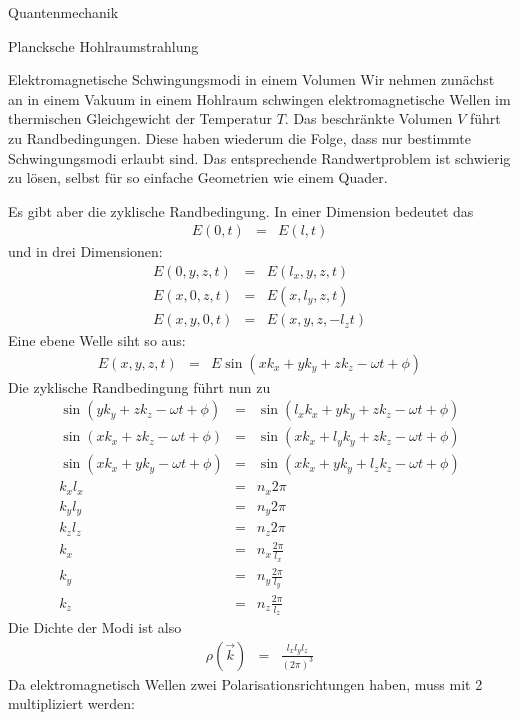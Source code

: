 \def\titlestr{Quantenmechanik}
\ifx\makebook\undefined
	
\else
	\begin{chapter}{\titlestr}
\fi
\begin{section}{Plancksche Hohlraumstrahlung}
\begin{subsection}{Elektromagnetische Schwingungsmodi in einem Volumen}
Wir nehmen zunächst an in einem Vakuum in einem Hohlraum schwingen elektromagnetische Wellen im thermischen Gleichgewicht der Temperatur $T$. Das beschränkte Volumen $V$ führt zu Randbedingungen. Diese
haben wiederum die Folge, dass nur bestimmte Schwingungsmodi erlaubt sind. Das entsprechende Randwertproblem ist schwierig zu lösen, selbst für so einfache Geometrien wie einem Quader.

Es gibt aber die zyklische Randbedingung. In einer Dimension bedeutet das
\begin{eqnarray*}
E(0,t) &=& E(l,t)
\end{eqnarray*}
und in drei Dimensionen:
\begin{eqnarray*}
E(0,y,z,t) &=& E(l_x,y,z,t)\\
E(x,0,z,t) &=& E(x,l_y,z,t)\\
E(x,y,0,t) &=& E(x,y,z,-l_zt)
\end{eqnarray*}
Eine  ebene Welle siht so aus:
\begin{eqnarray*}
E(x,y,z,t) &=& E\sin(xk_x+yk_y+zk_z-\omega t+\phi)
\end{eqnarray*}
Die zyklische Randbedingung führt nun zu
\begin{eqnarray*}
\sin(yk_y+zk_z-\omega t+\phi) &=& \sin(l_xk_x+yk_y+zk_z-\omega t+\phi)\\
\sin(xk_x+zk_z-\omega t+\phi) &=& \sin(xk_x+l_yk_y+zk_z-\omega t+\phi)\\
\sin(xk_x+yk_y-\omega t+\phi) &=& \sin(xk_x+yk_y+l_zk_z-\omega t+\phi)\\
k_xl_x &=& n_x2\pi\\
k_yl_y &=& n_y2\pi\\
k_zl_z &=& n_z2\pi\\
k_x &=& n_x\frac{2\pi}{l_x}\\
k_y &=& n_y\frac{2\pi}{l_y}\\
k_z &=& n_z\frac{2\pi}{l_z}
\end{eqnarray*}
Die Dichte der Modi ist also
\begin{eqnarray*}
\rho(\vec{k}) &=& \frac{l_xl_yl_z}{(2\pi)^3}
\end{eqnarray*}
Da elektromagnetisch Wellen zwei Polarisationsrichtungen haben, muss mit 2 multipliziert werden:

\end{subsection}
\end{section}
\end{chapter}
